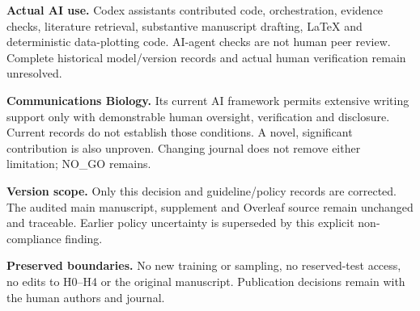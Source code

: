 \documentclass[11pt,a4paper]{article}
\begin{document}
\noindent\textbf{Actual AI use.} Codex assistants contributed code, orchestration, evidence checks, literature retrieval, substantive manuscript drafting, LaTeX and deterministic data-plotting code. AI-agent checks are not human peer review. Complete historical model/version records and actual human verification remain unresolved.

\noindent\textbf{Communications Biology.} Its current AI framework permits extensive writing support only with demonstrable human oversight, verification and disclosure. Current records do not establish those conditions. A novel, significant contribution is also unproven. Changing journal does not remove either limitation; NO\_GO remains.

\noindent\textbf{Version scope.} Only this decision and guideline/policy records are corrected. The audited main manuscript, supplement and Overleaf source remain unchanged and traceable. Earlier policy uncertainty is superseded by this explicit non-compliance finding.

\noindent\textbf{Preserved boundaries.} No new training or sampling, no reserved-test access, no edits to H0--H4 or the original manuscript. Publication decisions remain with the human authors and journal.
\end{document}
